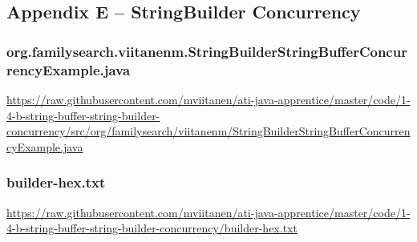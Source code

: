 


\subsection*{Appendix E -- StringBuilder Concurrency} \label{App:AppendixE}

\subsubsection*{org.familysearch.viitanenm.StringBuilderStringBufferConcurrencyExample.java}
\noindent
\begin{minipage}{.6in}
\end{minipage}
\begin{minipage}{6in}
  \url{https://raw.githubusercontent.com/mviitanen/ati-java-apprentice/master/code/1-4-b-string-buffer-string-builder-concurrency/src/org/familysearch/viitanenm/StringBuilderStringBufferConcurrencyExample.java}
\end{minipage}

\subsubsection*{builder-hex.txt}
\noindent
\begin{minipage}{.6in}
\end{minipage}
\begin{minipage}{6in}
  \url{https://raw.githubusercontent.com/mviitanen/ati-java-apprentice/master/code/1-4-b-string-buffer-string-builder-concurrency/builder-hex.txt}
\end{minipage}

